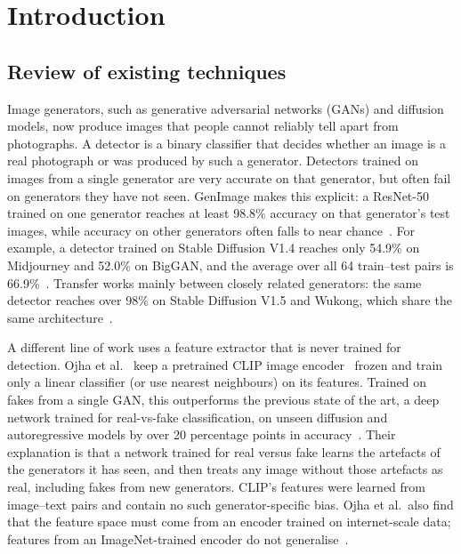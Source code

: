 \documentclass[10pt,a4paper]{article}
\begin{document}
\tableofcontents
\thispagestyle{empty}
\clearpage
\setcounter{page}{1}

\section{Introduction}\label{sec:intro}

\subsection{Review of existing techniques}

Image generators, such as generative adversarial networks (GANs) and diffusion models, now produce images that people cannot reliably tell apart from photographs. A detector is a binary classifier that decides whether an image is a real photograph or was produced by such a generator. Detectors trained on images from a single generator are very accurate on that generator, but often fail on generators they have not seen. GenImage makes this explicit: a ResNet-50 trained on one generator reaches at least 98.8\% accuracy on that generator's test images, while accuracy on other generators often falls to near chance~\cite{zhu2023genimage}. For example, a detector trained on Stable Diffusion V1.4 reaches only 54.9\% on Midjourney and 52.0\% on BigGAN, and the average over all 64 train--test pairs is 66.9\%~\cite{zhu2023genimage}. Transfer works mainly between closely related generators: the same detector reaches over 98\% on Stable Diffusion V1.5 and Wukong, which share the same architecture~\cite{zhu2023genimage}.

A different line of work uses a feature extractor that is never trained for detection. Ojha et al.~\cite{ojha2023universal} keep a pretrained CLIP image encoder~\cite{radford2021clip} frozen and train only a linear classifier (or use nearest neighbours) on its features. Trained on fakes from a single GAN, this outperforms the previous state of the art, a deep network trained for real-vs-fake classification, on unseen diffusion and autoregressive models by over 20 percentage points in accuracy~\cite{ojha2023universal}. Their explanation is that a network trained for real versus fake learns the artefacts of the generators it has seen, and then treats any image without those artefacts as real, including fakes from new generators. CLIP's features were learned from image--text pairs and contain no such generator-specific bias. Ojha et al.\ also find that the feature space must come from an encoder trained on internet-scale data; features from an ImageNet-trained encoder do not generalise~\cite{ojha2023universal}.
\end{document}
